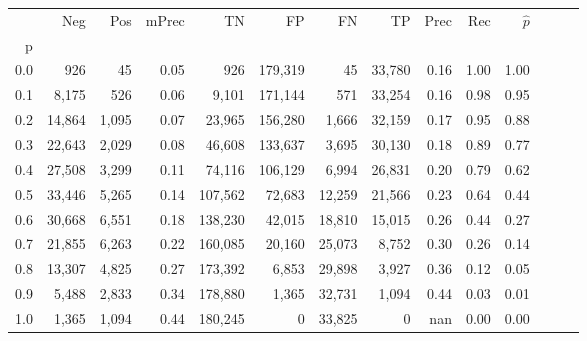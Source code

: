 \begin{tabular}{rrrrrrrrrrrrrr}
\toprule
{} &     Neg &    Pos & mPrec &       TN &       FP &      FN &      TP &  Prec &   Rec & $\hat{p}$ \\
p   &         &        &       &          &          &         &         &       &       &           \\
\midrule
0.0 &     926 &     45 &  0.05 &      926 &  179,319 &      45 &  33,780 &  0.16 &  1.00 &      1.00 \\
0.1 &   8,175 &    526 &  0.06 &    9,101 &  171,144 &     571 &  33,254 &  0.16 &  0.98 &      0.95 \\
0.2 &  14,864 &  1,095 &  0.07 &   23,965 &  156,280 &   1,666 &  32,159 &  0.17 &  0.95 &      0.88 \\
0.3 &  22,643 &  2,029 &  0.08 &   46,608 &  133,637 &   3,695 &  30,130 &  0.18 &  0.89 &      0.77 \\
0.4 &  27,508 &  3,299 &  0.11 &   74,116 &  106,129 &   6,994 &  26,831 &  0.20 &  0.79 &      0.62 \\
0.5 &  33,446 &  5,265 &  0.14 &  107,562 &   72,683 &  12,259 &  21,566 &  0.23 &  0.64 &      0.44 \\
0.6 &  30,668 &  6,551 &  0.18 &  138,230 &   42,015 &  18,810 &  15,015 &  0.26 &  0.44 &      0.27 \\
0.7 &  21,855 &  6,263 &  0.22 &  160,085 &   20,160 &  25,073 &   8,752 &  0.30 &  0.26 &      0.14 \\
0.8 &  13,307 &  4,825 &  0.27 &  173,392 &    6,853 &  29,898 &   3,927 &  0.36 &  0.12 &      0.05 \\
0.9 &   5,488 &  2,833 &  0.34 &  178,880 &    1,365 &  32,731 &   1,094 &  0.44 &  0.03 &      0.01 \\
1.0 &   1,365 &  1,094 &  0.44 &  180,245 &        0 &  33,825 &       0 &   nan &  0.00 &      0.00 \\
\bottomrule
\end{tabular}
